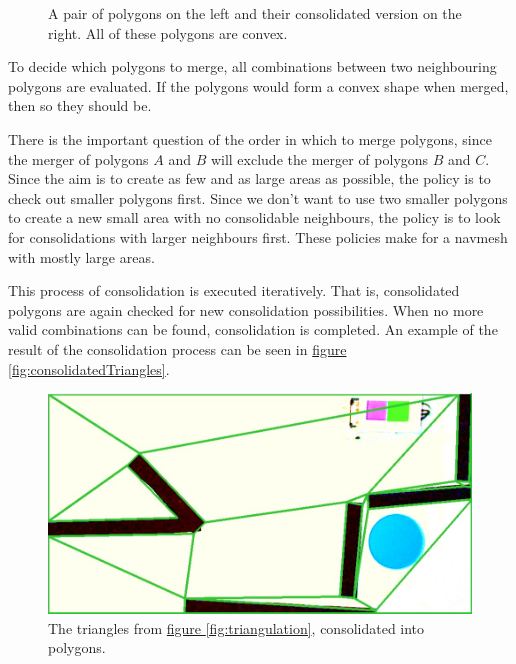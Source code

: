 \documentclass[10pt, abstracton, twocolumn]{scrartcl}
\newcommand{\fref}[1]{\hyperref[#1]{figure \vref{#1}}}
\begin{document}
\begin{figure}[h]
        \centering
        \begin{subfigure}[t]{0.45\columnwidth}
        \centering
        
        \end{subfigure}
        \begin{subfigure}[t]{0.45\columnwidth}
        \centering
        
        \end{subfigure}
        \caption{\small A pair of polygons on the left and their consolidated version on the right. All of these polygons are convex.}
        \label{fig:consolidation}
\end{figure}

To decide which polygons to merge, all combinations between two neighbouring polygons are evaluated. If the polygons would form a convex shape when merged, then so they should be.

There is the important question of the order in which to merge polygons, since the merger of polygons $A$ and $B$ will exclude the merger of polygons $B$ and $C$. Since the aim is to create as few and as large areas as possible, the policy is to check out smaller polygons first. Since we don't want to use two smaller polygons to create a new small area with no consolidable neighbours, the policy is to look for consolidations with larger neighbours first. These policies make for a navmesh with mostly large areas.

This process of consolidation is executed iteratively. That is, consolidated polygons are again checked for new consolidation possibilities. When no more valid combinations can be found, consolidation is completed. An example of the result of the consolidation process can be seen in \fref{fig:consolidatedTriangles}.

\begin{figure}[h]
        \centering
        \includegraphics[width=\columnwidth]{pictures/consolidatedTriangles.png}
        \caption{\small The triangles from \fref{fig:triangulation}, consolidated into polygons.}
        \label{fig:consolidatedTriangles}
\end{figure}
\end{document}
